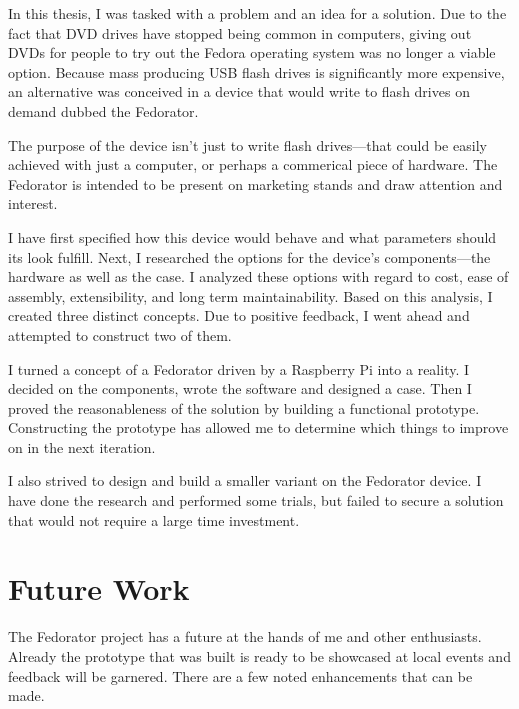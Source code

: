 \label{Conclusion}
        
        In this thesis, I was tasked with a problem and an idea for a solution.  Due to the fact that DVD drives have stopped being common in computers, giving out DVDs for people to try out the Fedora operating system was no longer a viable option.  Because mass producing USB flash drives is significantly more expensive, an alternative was conceived in a device that would write to flash drives on demand dubbed the Fedorator.
        
        The purpose of the device isn't just to write flash drives—that could be easily achieved with just a computer, or perhaps a commerical piece of hardware.  The Fedorator is intended to be present on marketing stands and draw attention and interest.
        
        I have first specified how this device would behave and what parameters should its look fulfill.  Next, I researched the options for the device's components—the hardware as well as the case.  I analyzed these options with regard to cost, ease of assembly, extensibility, and long term maintainability.  Based on this analysis, I created three distinct concepts.  Due to positive feedback, I went ahead and attempted to construct two of them.
        
        I turned a concept of a Fedorator driven by a Raspberry Pi into a reality.  I decided on the components, wrote the software and designed a case.  Then I proved the reasonableness of the solution by building a functional prototype.  Constructing the prototype has allowed me to determine which things to improve on in the next iteration.
        
        I also strived to design and build a smaller variant on the Fedorator device.  I have done the research and performed some trials, but failed to secure a solution that would not require a large time investment.%
        
        
    \section{Future Work}
        The Fedorator project has a future at the hands of me and other enthusiasts.  Already the prototype that was built is ready to be showcased at local events and feedback will be garnered.  There are a few noted enhancements that can be made.
        
        
        
